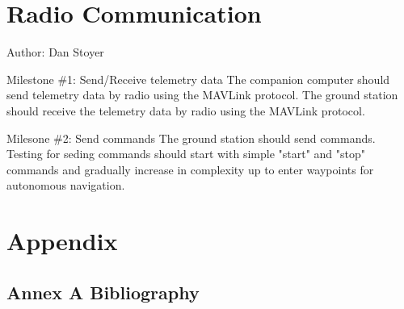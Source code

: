 \documentclass[compsoc,draftclsnofoot,onecolumn,10pt]{IEEEtran}
\begin{document}
\section{Radio Communication}
Author: Dan Stoyer\par

Milestone \#1: Send/Receive telemetry data
The companion computer should send telemetry data by radio using the MAVLink
protocol. The ground station should receive the telemetry data by radio using
the MAVLink protocol.

Milesone \#2: Send commands
The ground station should send commands. Testing for seding commands should
start with simple "start" and "stop" commands and gradually increase in
complexity up to enter waypoints for autonomous navigation.


\section{Appendix}
\subsection{Annex A  Bibliography} 


\end{document}
